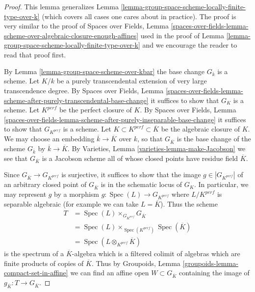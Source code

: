 \documentclass{stacks-project}
\theoremstyle{plain}
\theoremstyle{definition}
\theoremstyle{remark}
\numberwithin{equation}{subsection}
\def\Spec{\mathop{\mathrm{Spec}}}
\begin{document}
\begin{proof}
This lemma generalizes
Lemma \ref{lemma-group-space-scheme-locally-finite-type-over-k}
(which covers all cases one cares about in practice).
The proof is very similar to the proof of
Spaces over Fields, Lemma
\ref{spaces-over-fields-lemma-scheme-over-algebraic-closure-enough-affines}
used in the proof of
Lemma \ref{lemma-group-space-scheme-locally-finite-type-over-k}
and we encourage the reader to read that proof first.

\medskip\noindent
By Lemma \ref{lemma-group-space-scheme-over-kbar} the base
change $G_{\overline{k}}$ is a scheme.
Let $K/k$ be a purely transcendental extension of very large
transcendence degree. By Spaces over Fields, Lemma
\ref{spaces-over-fields-lemma-scheme-after-purely-transcendental-base-change}
it suffices to show that $G_K$ is a scheme.
Let $K^{perf}$ be the perfect closure of $K$. By
Spaces over Fields, Lemma
\ref{spaces-over-fields-lemma-scheme-after-purely-inseparable-base-change}
it suffices to show that $G_{K^{perf}}$ is a scheme.
Let $K \subset K^{perf} \subset \overline{K}$ be the algebraic closure
of $K$. We may choose an embedding $\overline{k} \to \overline{K}$ over
$k$, so that $G_{\overline{K}}$ is the base change of the scheme
$G_{\overline{k}}$ by $\overline{k} \to \overline{K}$. By
Varieties, Lemma \ref{varieties-lemma-make-Jacobson}
we see that $G_{\overline{K}}$ is a Jacobson scheme all of whose
closed points have residue field $\overline{K}$.

\medskip\noindent
Since $G_{\overline{K}} \to G_{K^{perf}}$ is surjective, it suffices to
show that the image $g \in |G_{K^{perf}}|$ of an arbitrary closed point of
$G_{\overline{K}}$ is in the schematic locus of $G_K$.
In particular, we may represent $g$ by a morphism
$g : \Spec(L) \to G_{K^{perf}}$ where $L/K^{perf}$ is separable algebraic
(for example we can take $L = \overline{K}$). Thus the scheme
\begin{align*}
T & = \Spec(L) \times_{G_{K^{perf}}} G_{\overline{K}} \\
& =
\Spec(L) \times_{\Spec(K^{perf})} \Spec(\overline{K}) \\
& =
\Spec(L \otimes_{K^{perf}} \overline{K})
\end{align*}
is the spectrum of a $\overline{K}$-algebra which is a filtered colimit
of algebras which are finite products of copies of $\overline{K}$.
Thus by Groupoids, Lemma \ref{groupoids-lemma-compact-set-in-affine}
we can find an affine open $W \subset G_{\overline{K}}$ containing
the image of $g_{\overline{K}} : T \to G_{\overline{K}}$.


\end{proof}
\end{document}
